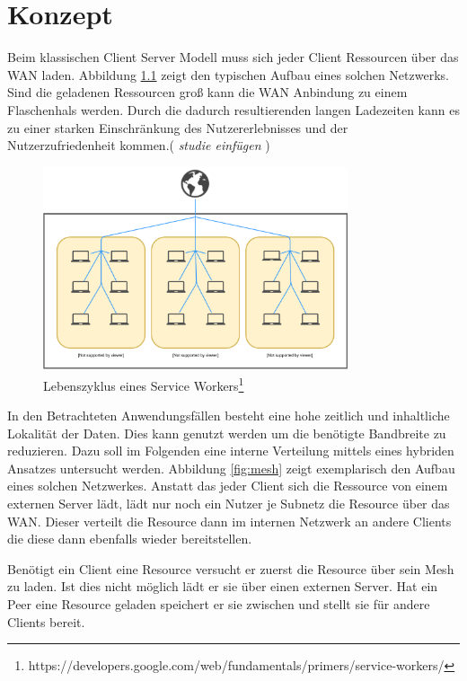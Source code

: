 \chapter{Konzept}\label{ch:concept}
%
Beim klassischen Client Server Modell muss sich jeder Client Ressourcen über das WAN laden. Abbildung \ref{fig:school} zeigt den typischen Aufbau eines solchen Netzwerks. Sind die geladenen Ressourcen groß kann die WAN Anbindung zu einem Flaschenhals werden. Durch die dadurch resultierenden langen Ladezeiten kann es zu einer starken Einschränkung des Nutzererlebnisses und der Nutzerzufriedenheit kommen.(\emph{\color{red} studie einfügen })

\begin{figure}[!h]
	\centering
	\includegraphics[width=0.8\textwidth]{figures/school}
	\caption[A Figure Short-Title]{Lebenszyklus eines Service Workers\footnote{https://developers.google.com/web/fundamentals/primers/service-workers/}}
	\label{fig:school}
\end{figure}

In den Betrachteten Anwendungsfällen besteht eine hohe zeitlich und inhaltliche Lokalität der Daten. Dies kann genutzt werden um die benötigte Bandbreite zu reduzieren. Dazu soll im Folgenden eine interne Verteilung mittels eines hybriden \pTp Ansatzes untersucht werden. Abbildung \ref{fig:mesh} zeigt exemplarisch den Aufbau eines solchen Netzwerkes. Anstatt das jeder Client sich die Ressource von einem externen Server lädt, lädt nur noch ein Nutzer je Subnetz die Resource über das WAN. Dieser verteilt die Resource dann im internen Netzwerk an andere Clients die diese dann ebenfalls wieder bereitstellen.

Benötigt ein Client eine Resource versucht er zuerst die Resource über sein \pTp Mesh zu laden. Ist dies nicht möglich lädt er sie über einen externen Server. Hat ein Peer eine Resource geladen speichert er sie zwischen und stellt sie für andere Clients bereit.


